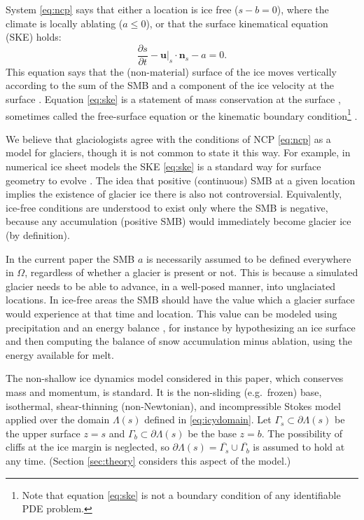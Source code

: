 \documentclass[hidelinks,onefignum,onetabnum,final]{siamart220329}  %
\newcommand{\bn}{\mathbf{n}}
\newcommand{\bu}{\mathbf{u}}
\begin{document}
System \eqref{eq:ncp} says that either a location is ice free ($s-b=0$), where the climate is locally ablating ($a\le 0$), or that the surface kinematical equation (SKE) holds:
\begin{equation}
\frac{\partial s}{\partial t} - \bu|_s \cdot \bn_s - a = 0.  \label{eq:ske}
\end{equation}
This equation says that the (non-material) surface of the ice moves vertically according to the sum of the SMB and a component of the ice velocity at the surface \cite{SchoofHewitt2013}.  Equation \eqref{eq:ske} is a statement of mass conservation at the surface \cite{Aschwandenetal2012}, sometimes called the free-surface equation \cite{LofgrenAhlkronaHelanow2022} or the kinematic boundary condition\footnote{Note that equation \eqref{eq:ske} is not a boundary condition of any identifiable PDE problem.} \cite{GreveBlatter2009}.

We believe that glaciologists agree with the conditions of NCP \eqref{eq:ncp} as a model for glaciers, though it is not common to state it this way.  For example, in numerical ice sheet models the SKE \eqref{eq:ske} is a standard way for surface geometry to evolve \cite{GreveBlatter2009,SchoofHewitt2013}.  The idea that positive (continuous) SMB at a given location implies the existence of glacier ice there is also not controversial.  Equivalently, ice-free conditions are understood to exist only where the SMB is negative, because any accumulation (positive SMB) would immediately become glacier ice (by definition).

In the current paper the SMB $a$ is necessarily assumed to be defined everywhere in $\Omega$, regardless of whether a glacier is present or not.  This is because a simulated glacier needs to be able to advance, in a well-posed manner, into unglaciated locations.  In ice-free areas the SMB should have the value which a glacier surface would experience at that time and location.  This value can be modeled using precipitation and an energy balance \cite{GreveBlatter2009}, for instance by hypothesizing an ice surface and then computing the balance of snow accumulation minus ablation, using the energy available for melt.

The non-shallow ice dynamics model considered in this paper, which conserves mass and momentum, is standard.  It is the non-sliding (e.g.~frozen) base, isothermal, shear-thinning (non-Newtonian), and incompressible Stokes model \cite{GreveBlatter2009,JouvetRappaz2011,SchoofHewitt2013} applied over the domain $\Lambda(s)$ defined in \eqref{eq:icydomain}.  Let $\Gamma_s \subset \partial \Lambda(s)$ be the upper surface $z=s$ and $\Gamma_b \subset \partial \Lambda(s)$ be the base $z=b$.  The possibility of cliffs at the ice margin is neglected, so $\partial \Lambda(s) = \overline{\Gamma_s} \cup \overline{\Gamma_b}$ is assumed to hold at any time.  (Section \ref{sec:theory} considers this aspect of the model.)
\end{document}
